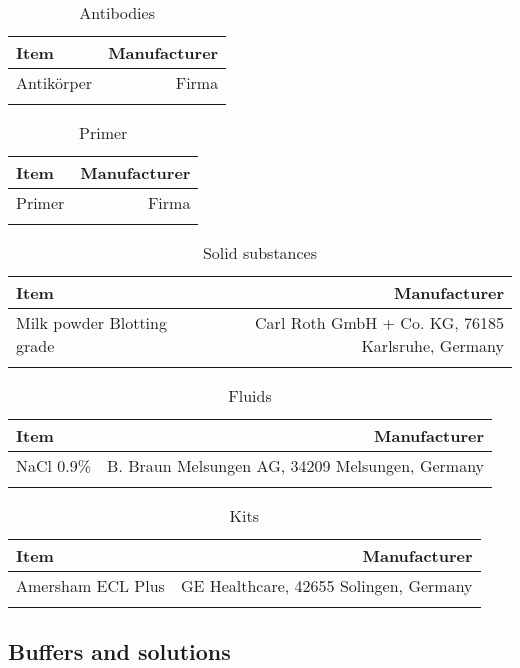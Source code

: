 \documentclass[
	    a4paper, 				%
	    bibliography=totocnumbered,		%
	    listof=totocnumbered,		%
	    11pt, 				%
]{scrreprt}
\begin{document}
				\begin{longtable}{||l|r||}
						Item&Manufacturer\\
					\hline\hline
						\multirow{2}{0.62\textwidth}{Antikörper}&
						\multirow{2}{0.30\textwidth}{Firma}\\&\\	
					\hline\hline
					\caption{Antibodies}
				\end{longtable}
				\begin{longtable}{||l|r||}
							Item&Manufacturer\\
						\hline\hline
							\multirow{2}{0.62\textwidth}{Primer}&
							\multirow{2}{0.30\textwidth}{Firma}\\&\\			
						\hline\hline	
						\caption{Primer}
					\end{longtable}
					\begin{longtable}{||l|r||}
							Item&Manufacturer\\
						\hline\hline
							\multirow{2}{0.62\textwidth}{Milk powder Blotting grade}&
							\multirow{2}{0.30\textwidth}{Carl Roth GmbH + Co. KG, 76185 Karlsruhe, Germany}\\&\\
						\hline\hline
						\caption{Solid substances}
					\end{longtable}
					\begin{longtable}{||l|r||}
							Item&Manufacturer\\
						\hline\hline
							\multirow{3}{0.62\textwidth}{NaCl 0.9\%}&
							\multirow{3}{0.30\textwidth}{B. Braun Melsungen AG, 34209 Melsungen, Germany}\\&\\&\\
						\hline\hline
						\caption{Fluids}
					\end{longtable}
					\begin{longtable}{||l|r||}
							Item&Manufacturer\\
						\hline\hline
							\multirow{2}{0.62\textwidth}{Amersham ECL Plus}&
							\multirow{2}{0.30\textwidth}{GE Healthcare, 42655 Solingen, Germany}\\&\\
						\hline\hline
					\caption{Kits}
				\end{longtable}

				
			\subsection{Buffers and solutions}
\end{document}
